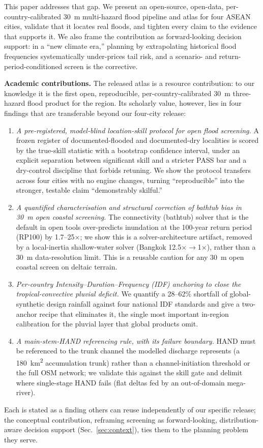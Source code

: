 \documentclass[conference]{IEEEtran}
\begin{document}
This paper addresses that gap. We present an open-source, open-data, per-country-calibrated 30~m multi-hazard flood pipeline and atlas for four ASEAN cities, validate that it locates real floods, and tighten every claim to the evidence that supports it. We also frame the contribution as forward-looking decision support: in a ``new climate era,'' planning by extrapolating historical flood frequencies systematically under-prices tail risk, and a scenario- and return-period-conditioned screen is the corrective.

\textbf{Academic contributions.} The released atlas is a resource contribution: to our knowledge it is the first open, reproducible, per-country-calibrated 30~m three-hazard flood product for the region. Its scholarly value, however, lies in four findings that are transferable beyond our four-city release:
\begin{enumerate}[leftmargin=*,itemsep=1pt,topsep=2pt]
\item \emph{A pre-registered, model-blind location-skill protocol for open flood screening.} A frozen register of documented-flooded and documented-dry localities is scored by the true-skill statistic with a bootstrap confidence interval, under an explicit separation between significant skill and a stricter PASS bar and a dry-control discipline that forbids retuning. We show the protocol transfers across four cities with no engine changes, turning ``reproducible'' into the stronger, testable claim ``demonstrably skilful.''
\item \emph{A quantified characterisation and structural correction of bathtub bias in 30~m open coastal screening.} The connectivity (bathtub) solver that is the default in open tools over-predicts inundation at the 100-year return period (RP100) by 1.7--25$\times$; we show this is a solver-architecture artifact, removed by a local-inertia shallow-water solver (Bangkok 12.5$\times{\rightarrow}$1$\times$), rather than a 30~m data-resolution limit. This is a reusable caution for any 30~m open coastal screen on deltaic terrain.
\item \emph{Per-country Intensity--Duration--Frequency (IDF) anchoring to close the tropical-convective pluvial deficit.} We quantify a 28--62\% shortfall of global-synthetic design rainfall against four national IDF standards and give a two-anchor recipe that eliminates it, the single most important in-region calibration for the pluvial layer that global products omit.
\item \emph{A main-stem-HAND referencing rule, with its failure boundary.} HAND must be referenced to the trunk channel the modelled discharge represents (a 180~km\textsuperscript{2} accumulation trunk) rather than a channel-initiation threshold or the full OSM network; we validate this against the skill gate and delimit where single-stage HAND fails (flat deltas fed by an out-of-domain mega-river).
\end{enumerate}
Each is stated as a finding others can reuse independently of our specific release; the conceptual contribution, reframing screening as forward-looking, distribution-aware decision support (Sec.~\ref{sec:context}), ties them to the planning problem they serve.
\end{document}
